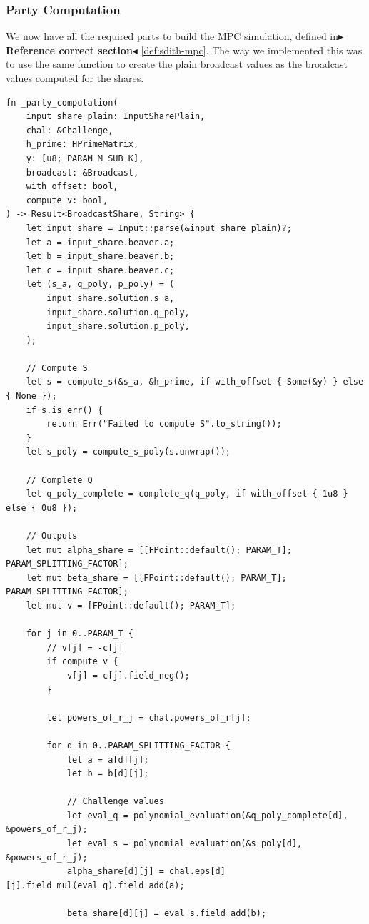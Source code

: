 \documentclass[11pt]{report}
\theoremstyle{definition}
\theoremstyle{plain}
\newcommand{\todo}[1]{{\color[rgb]{.5,0,0}\textbf{$\blacktriangleright$#1$\blacktriangleleft$}}}
\begin{document}
\subsubsection{Party Computation}
We now have all the required parts to build the MPC simulation, defined in\todo{Reference correct section} \autoref{def:sdith-mpc}. The way we implemented this was to use the same function to create the plain broadcast values as the broadcast values computed for the shares.
\begin{verbatim}
fn _party_computation(
    input_share_plain: InputSharePlain,
    chal: &Challenge,
    h_prime: HPrimeMatrix,
    y: [u8; PARAM_M_SUB_K],
    broadcast: &Broadcast,
    with_offset: bool,
    compute_v: bool,
) -> Result<BroadcastShare, String> {
    let input_share = Input::parse(&input_share_plain)?;
    let a = input_share.beaver.a;
    let b = input_share.beaver.b;
    let c = input_share.beaver.c;
    let (s_a, q_poly, p_poly) = (
        input_share.solution.s_a,
        input_share.solution.q_poly,
        input_share.solution.p_poly,
    );

    // Compute S
    let s = compute_s(&s_a, &h_prime, if with_offset { Some(&y) } else { None });
    if s.is_err() {
        return Err("Failed to compute S".to_string());
    }
    let s_poly = compute_s_poly(s.unwrap());

    // Complete Q
    let q_poly_complete = complete_q(q_poly, if with_offset { 1u8 } else { 0u8 });

    // Outputs
    let mut alpha_share = [[FPoint::default(); PARAM_T]; PARAM_SPLITTING_FACTOR];
    let mut beta_share = [[FPoint::default(); PARAM_T]; PARAM_SPLITTING_FACTOR];
    let mut v = [FPoint::default(); PARAM_T];

    for j in 0..PARAM_T {
        // v[j] = -c[j]
        if compute_v {
            v[j] = c[j].field_neg();
        }

        let powers_of_r_j = chal.powers_of_r[j];

        for d in 0..PARAM_SPLITTING_FACTOR {
            let a = a[d][j];
            let b = b[d][j];

            // Challenge values
            let eval_q = polynomial_evaluation(&q_poly_complete[d], &powers_of_r_j);
            let eval_s = polynomial_evaluation(&s_poly[d], &powers_of_r_j);
            alpha_share[d][j] = chal.eps[d][j].field_mul(eval_q).field_add(a);

            beta_share[d][j] = eval_s.field_add(b);


\end{verbatim}
\end{document}
